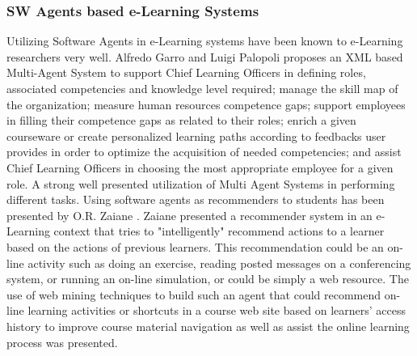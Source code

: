 \documentclass[12pt,a4paper,final,twoside,onecolumn,titlepage]{book}
\begin{document}
\subsubsection{SW Agents based e-Learning Systems}
Utilizing Software Agents in e-Learning systems have been known to e-Learning researchers very well. Alfredo Garro  and Luigi Palopoli \cite{R45} proposes an \gls{XML} based Multi-Agent System to support Chief Learning Officers in defining roles, associated competencies and knowledge level required; manage the skill map of the organization; measure human resources competence gaps; support employees in filling their competence gaps as related to their roles; enrich a given courseware or create personalized learning paths according to feedbacks user provides in order to optimize the acquisition of needed competencies; and assist Chief Learning Officers in choosing the most appropriate employee for a given role. A strong well presented utilization of Multi Agent Systems in performing different tasks. 
Using software agents as recommenders to students has been presented by O.R. Zaiane \cite{R46}. Zaiane presented a recommender system in an e-Learning context that tries to "intelligently" recommend actions to a learner based on the actions of previous learners. This recommendation could be an on-line activity such as doing an exercise, reading posted messages on a conferencing system, or running an on-line simulation, or could be simply a web resource. The use of web mining techniques to build such an agent that could recommend on-line learning activities or shortcuts in a course web site based on learners' access history to improve course material navigation as well as assist the online learning process was presented. 
\end{document}
